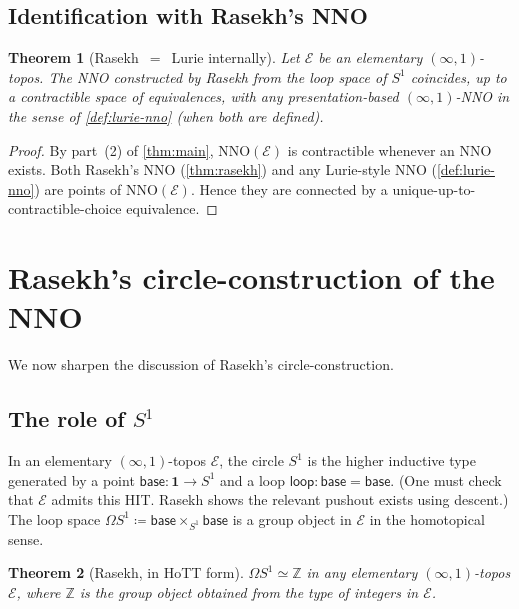 \documentclass[12pt]{article}
\newtheorem{theorem}{Theorem}[section]
\theoremstyle{definition}
\theoremstyle{remark}
\newcommand{\Z}{\mathbb{Z}}
\newcommand{\eqv}{\simeq}
\newcommand{\looppath}{\mathsf{loop}}
\newcommand{\base}{\mathsf{base}}
\newcommand{\Sone}{S^{1}}
\begin{document}
\subsection{Identification with Rasekh's NNO}

\begin{theorem}[Rasekh~$=$~Lurie internally]\label{thm:rasekh-lurie}
Let $\mathcal{E}$ be an elementary $(\infty,1)$-topos. The NNO constructed by Rasekh from the loop space of $\Sone$ coincides, up to a contractible space of equivalences, with any presentation-based $(\infty,1)$-NNO in the sense of \cref{def:lurie-nno} (when both are defined).
\end{theorem}

\begin{proof}
By part~(2) of \cref{thm:main}, $\mathrm{NNO}(\mathcal{E})$ is contractible whenever an NNO exists. Both Rasekh's NNO (\cref{thm:rasekh}) and any Lurie-style NNO (\cref{def:lurie-nno}) are points of $\mathrm{NNO}(\mathcal{E})$. Hence they are connected by a unique-up-to-contractible-choice equivalence.
\end{proof}

\section{Rasekh's circle-construction of the NNO}\label{sec:rasekh}

We now sharpen the discussion of Rasekh's circle-construction.

\subsection{The role of \texorpdfstring{$\Sone$}{S\^{}1}}

In an elementary $(\infty,1)$-topos $\mathcal{E}$, the circle $\Sone$ is the higher inductive type generated by a point $\base\colon \mathbf{1}\to \Sone$ and a loop $\looppath\colon \base = \base$. (One must check that $\mathcal{E}$ admits this HIT\@. Rasekh shows the relevant pushout exists using descent.) The loop space $\Omega\Sone\coloneqq\base\times_{\Sone}\base$ is a group object in $\mathcal{E}$ in the homotopical sense.

\begin{theorem}[Rasekh, in HoTT form]\label{thm:rasekh-hott}
$\Omega\Sone\eqv\Z$ in any elementary $(\infty,1)$-topos $\mathcal{E}$, where $\Z$ is the group object obtained from the type of integers in $\mathcal{E}$.
\end{theorem}
\end{document}
